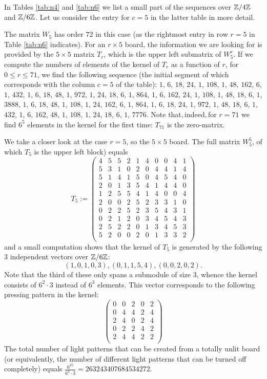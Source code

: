\begin{example}
In Tables \ref{tab:n4} and \ref{tab:n6} we list a small part of the
sequences over $\mathbb{Z}/4\mathbb{Z}$ and $\mathbb{Z}/6\mathbb{Z}$. Let us consider the
entry for $c=5$ in the latter table in more detail.

The matrix $W_5$ has order $72$ in this case (as the rightmost entry
in row $r=5$ in Table \ref{tab:n6} indicates). For an $r\times 5$
board, the information we are looking for is provided by the
$5\times 5$ matrix $T_r$, which is the upper left submatrix of $W_5^r$.
If we compute the numbers of elements of the kernel of $T_r$ as a
function of $r$, for $0\leq r\leq 71$, we find the following
sequence (the initial segment
of which corresponds with the column $c=5$ of the table):
$1$, $6$, $18$, $24$, $1$, $108$, $1$, $48$, $162$, $6$, $1$, $432$, $1$, $6$, $18$, $48$, $1$, $972$, $1$, $24$, $18$, $
6$, $1$, $864$, $1$, $6$, $162$, $24$, $1$, $108$, $1$, $48$, $18$, $6$, $1$, $3888$, $1$, $6$, $18$, $48$, $1$, $108$, $
1$, $24$, $162$, $6$, $1$, $864$, $1$, $6$, $18$, $24$, $1$, $972$, $1$, $48$, $18$, $6$, $1$, $432$, $1$, $6$, $162$, $
48$, $1$, $108$, $1$, $24$, $18$, $6$, $1$, $7776$.
Note that$, $indeed$, $for $r=71$ we find $6^5$ elements in the kernel
for the first time: $T_{71}$ is the zero-matrix.

We take a closer look at the case $r=5$, so the $5\times 5$ board.
The full matrix $W_5^5$, of which $T_5$ is the upper left block)
equals
$$T_5 := \left(
\begin{array}{cccccccccc}
4&5&5&2&1&4&0&0&4&1\\
5&3&1&0&2&0&4&4&1&4\\
5&1&4&1&5&0&4&5&4&0\\
2&0&1&3&5&4&1&4&4&0\\
1&2&5&5&4&1&4&0&0&4\\
2&0&0&2&5&2&3&3&1&0\\
0&2&2&5&2&3&5&4&3&1\\
0&2&1&2&0&3&4&5&4&3\\
2&5&2&2&0&1&3&4&5&3\\
5&2&0&0&2&0&1&3&3&2\\
\end{array}
\right)$$
and a small computation shows that the kernel of $T_5$
is generated by the following 3 independent vectors over $\mathbb{Z}/6\mathbb{Z}$:
$$(1, 0, 1, 0, 3), (0, 1, 1, 5, 4), (0, 0, 2, 0, 2).$$
Note that the third of these only spans a submodule of size $3$,
whence the kernel consists of $6^2\cdot 3$ instead of $6^3$
elements. This vector corresponds to the following
pressing pattern in the kernel:
$$\left(
\begin{array}{cccccccccc}
0&0&2&0&2\\
0&4&4&2&4\\
2&4&0&2&4\\
0&2&2&4&2\\
2&4&4&2&2\\
\end{array}
\right)$$
The total number of light patterns that can be created from
a totally unlit board (or equivalently, the number of different
light patterns that can be turned off completely) equals 
$\frac{6^{25}}{6^2\cdot 3}=263243407684534272$.
\end{example}
